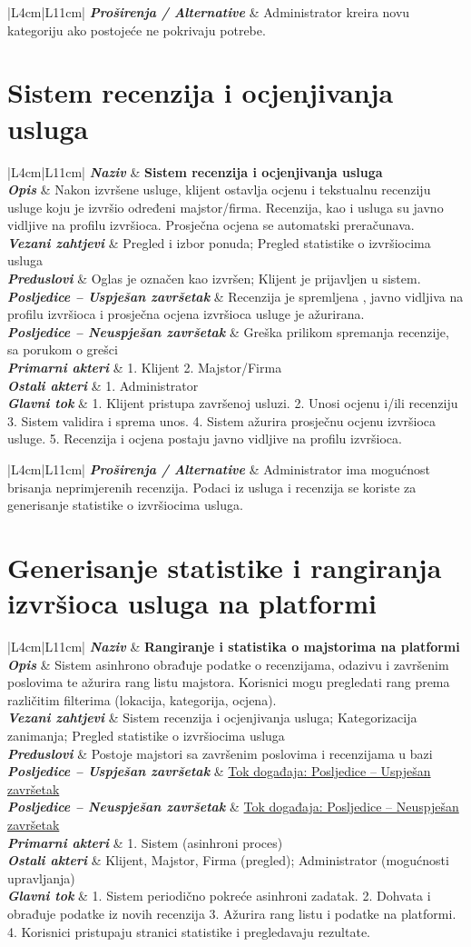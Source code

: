 \documentclass[12pt,a4paper]{article}
\newcommand{\usecase}[9]{%
\begin{longtable}{|L{4cm}|L{11cm}|}
\hline
\textbf{\textit{Naziv}} & \textbf{#1} \\
\hline
\textbf{\textit{Opis}} & #2 \\
\hline
\textbf{\textit{Vezani zahtjevi}} & #3 \\
\hline
\textbf{\textit{Preduslovi}} & #4 \\
\hline
\textbf{\textit{Posljedice -- Uspješan završetak}} & #5 \\
\hline
\textbf{\textit{Posljedice -- Neuspješan završetak}} & #6 \\
\hline
\textbf{\textit{Primarni akteri}} & #7 \\
\hline
\textbf{\textit{Ostali akteri}} & #8 \\
\hline
\textbf{\textit{Glavni tok}} & #9 \\
\hline
\end{longtable}%
}
\newcommand{\extensions}[1]{%
\vspace{-1.5em}
\begin{longtable}{|L{4cm}|L{11cm}|}
\hline
\textbf{\textit{Proširenja / Alternative}} & #1 \\
\hline
\end{longtable}%
}
\begin{document}
\extensions{Administrator kreira novu kategoriju ako postojeće ne pokrivaju potrebe.}

\section{Sistem recenzija i ocjenjivanja usluga}

\usecase
{Sistem recenzija i ocjenjivanja usluga}
{Nakon izvršene usluge, klijent ostavlja ocjenu i tekstualnu recenziju usluge koju je izvršio određeni majstor/firma. Recenzija, kao i usluga su javno vidljive na profilu izvršioca.
    Prosječna ocjena se automatski preračunava. }
{Pregled i izbor ponuda; Pregled statistike o izvršiocima usluga}
{Oglas je označen kao izvršen; Klijent je prijavljen u sistem.}
{Recenzija je spremljena , javno vidljiva na profilu izvršioca i prosječna ocjena izvršioca usluge je ažurirana.}
{Greška prilikom spremanja recenzije, sa porukom o grešci}
{1. Klijent 2. Majstor/Firma}
{1. Administrator}
{1. Klijent pristupa završenoj usluzi. 2. Unosi ocjenu i/ili recenziju 3. Sistem validira i sprema unos. 4. Sistem ažurira prosječnu ocjenu izvršioca usluge. 5. Recenzija i ocjena postaju javno vidljive na profilu izvršioca.}

\extensions{Administrator ima mogućnost brisanja neprimjerenih recenzija. Podaci iz usluga i recenzija se koriste za generisanje statistike o izvršiocima usluga.}


\section{Generisanje statistike i rangiranja izvršioca usluga na platformi}

\usecase
{Rangiranje i statistika o majstorima na platformi}
{Sistem asinhrono obrađuje podatke o recenzijama, odazivu i završenim poslovima te ažurira rang listu majstora. Korisnici mogu pregledati rang prema različitim filterima (lokacija, kategorija, ocjena).}
{Sistem recenzija i ocjenjivanja usluga; Kategorizacija zanimanja; Pregled statistike o izvršiocima usluga}
{Postoje majstori sa završenim poslovima i recenzijama u bazi}
{\hyperref[tok:4.1] {Tok događaja: Posljedice -- Uspješan završetak}}
{\hyperref[tok:4.2] {Tok događaja: Posljedice -- Neuspješan završetak}}
{1. Sistem (asinhroni proces)}
{Klijent, Majstor, Firma (pregled); Administrator (mogućnosti upravljanja)}
{1. Sistem periodično pokreće asinhroni zadatak. 2. Dohvata i obrađuje podatke iz novih recenzija 3. Ažurira rang listu i podatke na platformi. 4. Korisnici pristupaju stranici statistike i pregledavaju rezultate.}
\end{document}

